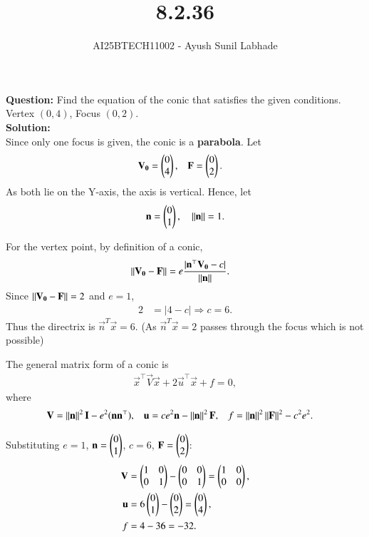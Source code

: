 \documentclass[journal,12pt,onecolumn]{IEEEtran}
\begin{document}
\title{8.2.36}
\author{AI25BTECH11002 - Ayush Sunil Labhade}
{\let\newpage\relax\maketitle}

\textbf{Question:} Find the equation of the conic that satisfies the given conditions.\\
Vertex $(0,4)$, Focus $(0,2)$.\\

\textbf{Solution:}\\
Since only one focus is given, the conic is a \textbf{parabola}.  
Let
\begin{align}
\mathbf{V_0} &= \begin{pmatrix}0 \\ 4\end{pmatrix}, &
\mathbf{F} &= \begin{pmatrix}0 \\ 2\end{pmatrix}.
\end{align}
As both lie on the Y-axis, the axis is vertical.  
Hence, let
\begin{align}
\mathbf{n} = \begin{pmatrix}0 \\ 1\end{pmatrix}, \quad \left\lVert\mathbf{n}\right\rVert = 1.
\end{align}

For the vertex point, by definition of a conic,
\begin{align}
\left\lVert\mathbf{V_0}-\mathbf{F}\right\rVert &= e \frac{|\mathbf{n}^\top\mathbf{V_0} - c|}{\left\lVert\mathbf{n}\right\rVert}.
\end{align}
Since $\left\lVert\mathbf{V_0}-\mathbf{F}\right\rVert = 2$ and $e=1$,
\begin{align}
2 &= |4 - c| \Rightarrow c = 6.
\end{align}
Thus the directrix is $\vec{n}^T\vec{x} = 6$.\newline
(As $\vec{n}^T\vec{x}=2$ passes through the focus which is not possible)

The general matrix form of a conic is
\begin{align}
\vec{x}^\top\vec{V}\vec{x} + 2\vec{u}^\top\vec{x} + f = 0,
\end{align}
where
\begin{align}
\mathbf{V} &= \left\lVert\mathbf{n}\right\rVert^2\mathbf{I} - e^2(\mathbf{n}\mathbf{n}^\top), &
\mathbf{u} &= ce^2\mathbf{n} - \left\lVert\mathbf{n}\right\rVert^2\mathbf{F}, &
f &= \left\lVert\mathbf{n}\right\rVert^2\left\lVert\mathbf{F}\right\rVert^2 - c^2e^2.
\end{align}

Substituting $e=1$, $\mathbf{n}=\begin{pmatrix}0\\1\end{pmatrix}$, $c=6$, $\mathbf{F}=\begin{pmatrix}0\\2\end{pmatrix}$:
\begin{align}
\mathbf{V} &= \begin{pmatrix}1 & 0 \\ 0 & 1\end{pmatrix} - \begin{pmatrix}0 & 0 \\ 0 & 1\end{pmatrix} = \begin{pmatrix}1 & 0 \\ 0 & 0\end{pmatrix},\\
\mathbf{u} &= 6\begin{pmatrix}0 \\ 1\end{pmatrix} - \begin{pmatrix}0 \\ 2\end{pmatrix} = \begin{pmatrix}0 \\ 4\end{pmatrix},\\
f &= 4 - 36 = -32.
\end{align}
\end{document}
